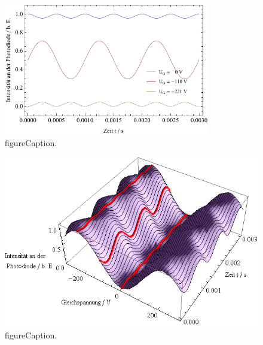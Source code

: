 \begin{figure}[H]
\begin{center}
  \includegraphics[width=0.8\textwidth]{../img/Pocktheo2.pdf}
  \caption{figureCaption.}
  \label{img:pocktheo2}
\end{center}
\end{figure}

\begin{figure}[H]
\begin{center}
  \includegraphics[width=\textwidth]{../img/Pocktheo3.png}
  \caption{figureCaption.}
  \label{img:pocktheo3}
\end{center}
\end{figure}






